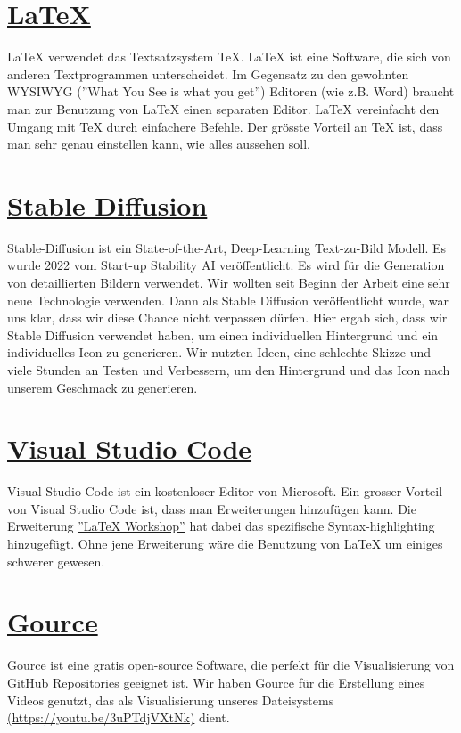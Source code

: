 \section{\href{https://www.latex-project.org/}{LaTeX}}
LaTeX verwendet das Textsatzsystem TeX. LaTeX ist eine Software, die sich von anderen Textprogrammen unterscheidet. Im Gegensatz zu den gewohnten WYSIWYG (''What You See is what you get'') Editoren (wie z.B. Word)
braucht man zur Benutzung von LaTeX einen separaten Editor. LaTeX vereinfacht den Umgang mit TeX durch einfachere Befehle. Der grösste Vorteil an TeX ist, dass man sehr genau einstellen kann, wie alles aussehen soll.


\section{\href{https://stability.ai/}{Stable Diffusion}}
Stable-Diffusion ist ein State-of-the-Art, Deep-Learning Text-zu-Bild Modell. Es wurde 2022 vom Start-up Stability AI veröffentlicht. Es wird für die Generation von detaillierten Bildern verwendet. Wir wollten seit
Beginn der Arbeit eine sehr neue Technologie verwenden. Dann als Stable Diffusion veröffentlicht wurde, war uns klar, dass wir diese Chance nicht verpassen dürfen. Hier ergab sich, dass wir Stable Diffusion verwendet haben, um einen individuellen
Hintergrund und ein individuelles Icon zu generieren. Wir nutzten Ideen, eine schlechte Skizze und viele Stunden an Testen und Verbessern, um den Hintergrund und das Icon nach unserem Geschmack zu generieren.

\section{\href{https://code.visualstudio.com/}{Visual Studio Code}}
Visual Studio Code ist ein kostenloser Editor von Microsoft. Ein grosser Vorteil von Visual Studio Code ist, dass man Erweiterungen hinzufügen kann. Die Erweiterung \href{https://marketplace.visualstudio.com/items?itemName=James-Yu.latex-workshop}{''LaTeX Workshop''}
hat dabei das spezifische Syntax-highlighting hinzugefügt. Ohne jene Erweiterung wäre die Benutzung von LaTeX um einiges schwerer gewesen.

\section{\href{https://gource.io/}{Gource}}
Gource ist eine gratis open-source Software, die perfekt für die Visualisierung von GitHub Repositories geeignet ist. Wir haben Gource für die Erstellung eines Videos genutzt, das als Visualisierung unseres Dateisystems \href{https://youtu.be/3uPTdjVXtNk}{(https://youtu.be/3uPTdjVXtNk)}
dient.


